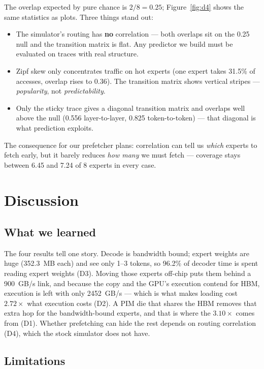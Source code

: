 \documentclass[11pt,a4paper]{report}
\begin{document}
The overlap expected by pure chance is $2/8 = 0.25$; Figure~\ref{fig:d4} shows the same statistics as plots. Three things stand out:
\begin{itemize}
\item The simulator's routing has \textbf{no} correlation --- both overlaps sit on the 0.25 null and the transition matrix is flat. Any predictor we build must be evaluated on traces with real structure.
\item Zipf skew only concentrates traffic on hot experts (one expert takes 31.5\% of accesses, overlap rises to 0.36). The transition matrix shows vertical stripes --- \textit{popularity}, not \textit{predictability}.
\item Only the sticky trace gives a diagonal transition matrix and overlaps well above the null (0.556 layer-to-layer, 0.825 token-to-token) --- that diagonal is what prediction exploits.
\end{itemize}

The consequence for our prefetcher plans: correlation can tell us \textit{which} experts to fetch early, but it barely reduces \textit{how many} we must fetch --- coverage stays between 6.45 and 7.24 of 8 experts in every case.

\chapter{Discussion}
\label{ch:disc}

\section{What we learned}

The four results tell one story. Decode is bandwidth bound; expert weights are huge (352.3~MB each) and see only 1--3 tokens, so 96.2\% of decoder time is spent reading expert weights (D3). Moving those experts off-chip puts them behind a 900~GB/s link, and because the copy and the GPU's execution contend for HBM, execution is left with only 2452~GB/s --- which is what makes loading cost $2.72\times$ what execution costs (D2). A PIM die that shares the HBM removes that extra hop for the bandwidth-bound experts, and that is where the $3.10\times$ comes from (D1). Whether prefetching can hide the rest depends on routing correlation (D4), which the stock simulator does not have.

\section{Limitations}
\end{document}
